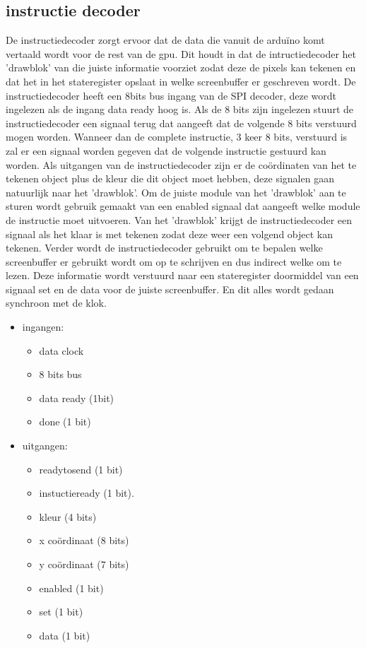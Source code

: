 \documentclass{scrartcl}
\begin{document}
\subsection { instructie decoder}

De instructiedecoder zorgt ervoor dat de data die vanuit de arduïno komt vertaald wordt voor de rest van de gpu. 
Dit houdt in dat de intructiedecoder het 'drawblok' van die juiste informatie voorziet zodat deze de pixels kan tekenen en dat het in het stateregister opslaat in welke screenbuffer er geschreven wordt.
De instructiedecoder heeft een 8bits bus ingang van de SPI decoder, deze wordt ingelezen als de ingang data ready hoog is. Als de 8 bits zijn ingelezen stuurt de instructiedecoder een signaal terug dat aangeeft dat de volgende 8 bits verstuurd mogen worden.
Wanneer dan de complete instructie, 3 keer 8 bits, verstuurd is zal er een signaal worden gegeven dat de volgende instructie gestuurd kan worden.
Als uitgangen van de instructiedecoder zijn er de coördinaten van het te tekenen object plus de kleur die dit object moet hebben, deze signalen gaan natuurlijk naar het 'drawblok'.
Om de juiste module van het 'drawblok' aan te sturen wordt gebruik gemaakt van een enabled signaal dat aangeeft welke module de instructie moet uitvoeren.
Van het 'drawblok' krijgt de instructiedecoder een signaal als het klaar is met tekenen zodat deze weer een volgend object kan tekenen. 
Verder wordt de instructiedecoder gebruikt om te bepalen welke screenbuffer er gebruikt wordt om op te schrijven en dus indirect welke om te lezen. Deze informatie wordt verstuurd naar een stateregister doormiddel van een signaal set en de data voor de juiste screenbuffer.
En dit alles wordt gedaan synchroon met de klok.

\begin {itemize}
\item ingangen:
\begin{itemize}
\item data clock  
\item 8 bits bus 
\item data ready (1bit)
\item done (1 bit)
\end{itemize}

\item uitgangen:
\begin{itemize}
\item readytosend (1 bit)
\item instuctieready (1 bit).
\item kleur (4 bits)
\item x coördinaat (8 bits)
\item y coördinaat (7 bits)
\item enabled (1 bit)
\item set (1 bit)
\item data (1 bit)
\end{itemize}
\end{itemize}
\end{document}
